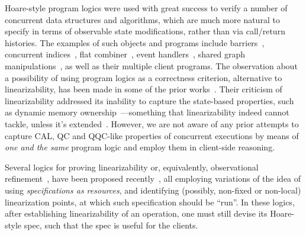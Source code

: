 Hoare-style program logics were used with great success to verify a
number of concurrent data structures and algorithms, which are much
more natural to specify in terms of observable state modifications,
rather than via call/return histories. The examples of such objects
and programs include
barriers~\cite{Dodds-al:POPL11,Hobor-Gherghina:ESOP11}, concurrent
indices~\cite{ArrozPincho-al:OOPSLA11}, flat
combiner~\cite{Turon-al:ICFP13,Sergey-al:ESOP15}, event
handlers~\cite{Svendsen-Birkedal:ESOP14}, shared graph
manipulations~\cite{Raad-al:ESOP15,Sergey-al:PLDI15}, as well as their
multiple client programs.
%
The observation about a possibility of using program logics as a
correctness criterion, alternative to linearizability, has been made
in some of the prior
works~\cite{Jacobs-Piessens:POPL11,ArrozPincho-al:OOPSLA11,Svendsen-al:ESOP13}.
%
Their criticism of linearizability addressed its inability to capture
the state-based properties, such as dynamic memory
ownership~\cite{Jacobs-Piessens:POPL11}---something that
linearizability indeed cannot tackle, unless it's
extended~\cite{Gotsman-Yang:CONCUR12}.
%
However, we are not aware of any prior attempts to capture CAL, QC and
QQC-like properties of concurrent executions by means of \emph{one and
  the same} program logic and employ them in client-side
reasoning.

%

Several logics for proving linearizability or, equivalently,
observational refinement~\cite{Filipovic-al:TCS10,Turon-al:POPL13},
have been proposed
recently~\cite{Turon-al:ICFP13,Liang-Feng:PLDI13,Vafeiadis:PhD}, all
employing variations of the idea of using \emph{specifications as
  resources}, and identifying (possibly, non-fixed or non-local)
linearization points, at which such specification should be ``run''.
%
In these logics, after establishing linearizability of an operation,
one must still devise its Hoare-style spec, such that the spec is useful for
the clients.

